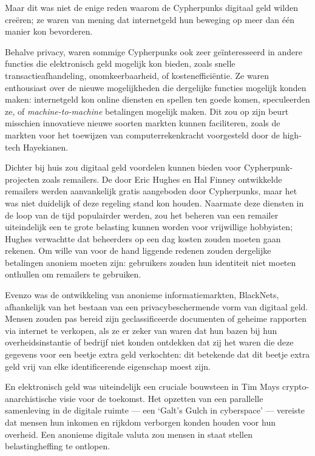 \documentclass[
  a5paper,
  smalldemyvopaper,11pt,twoside,onecolumn,openright,extrafontsizes,
hidelinks]{memoir}
\begin{document}
Maar dit was niet de enige reden waarom de Cypherpunks digitaal geld
wilden creëren; ze waren van mening dat internetgeld hun beweging op
meer dan één manier kon bevorderen.

Behalve privacy, waren sommige Cypherpunks ook zeer geïnteresseerd in
andere functies die elektronisch geld mogelijk kon bieden, zoals snelle
transactieafhandeling, onomkeerbaarheid, of kostenefficiëntie. Ze waren
enthousiast over de nieuwe mogelijkheden die dergelijke functies
mogelijk konden maken: internetgeld kon online diensten en spellen ten
goede komen, speculeerden ze, of \emph{machine-to-machine} betalingen
mogelijk maken. Dit zou op zijn beurt misschien innovatieve nieuwe
soorten markten kunnen faciliteren, zoals de markten voor het toewijzen
van computerrekenkracht voorgesteld door de high-tech Hayekianen.

Dichter bij huis zou digitaal geld voordelen kunnen bieden voor
Cypherpunk-projecten zoals remailers. De door Eric Hughes en Hal Finney
ontwikkelde remailers werden aanvankelijk gratis aangeboden door
Cypherpunks, maar het was niet duidelijk of deze regeling stand kon
houden. Naarmate deze diensten in de loop van de tijd populairder
werden, zou het beheren van een remailer uiteindelijk een te grote
belasting kunnen worden voor vrijwillige hobbyisten; Hughes verwachtte
dat beheerders op een dag kosten zouden moeten gaan rekenen. Om wille
van voor de hand liggende redenen zouden dergelijke betalingen anoniem
moeten zijn: gebruikers zouden hun identiteit niet moeten onthullen om
remailers te gebruiken.

Evenzo was de ontwikkeling van anonieme informatiemarkten, BlackNets,
afhankelijk van het bestaan van een privacybeschermende vorm van
digitaal geld. Mensen zouden pas bereid zijn geclassificeerde documenten
of geheime rapporten via internet te verkopen, als ze er zeker van waren
dat hun bazen bij hun overheidsinstantie of bedrijf niet konden
ontdekken dat zij het waren die deze gegevens voor een beetje extra geld
verkochten: dit betekende dat dit beetje extra geld vrij van elke
identificerende eigenschap moest zijn.

En elektronisch geld was uiteindelijk een cruciale bouwsteen in Tim Mays
crypto-anarchistische visie voor de toekomst. Het opzetten van een
parallelle samenleving in de digitale ruimte --- een `Galt's Gulch in
cyberspace' --- vereiste dat mensen hun inkomen en rijkdom verborgen
konden houden voor hun overheid. Een anonieme digitale valuta zou mensen
in staat stellen belastingheffing te ontlopen.
\end{document}
